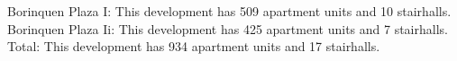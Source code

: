 {Borinquen Plaza I}: This development has 509 apartment units and 10 stairhalls.\\{Borinquen Plaza Ii}: This development has 425 apartment units and 7 stairhalls.\\{Total}: This development has 934 apartment units and 17 stairhalls.\\